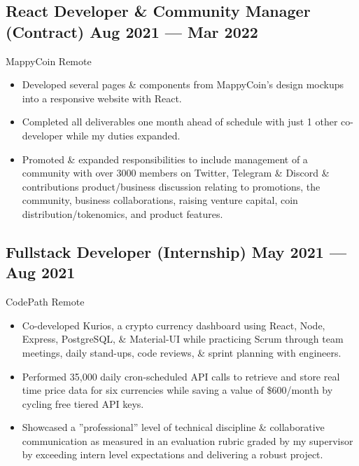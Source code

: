 \documentclass[a4,10pt]{article}
\newcommand{\subtext}[1]{
#1\par\vspace{-0.2cm}}
\newenvironment{zitemize}{
\begin{itemize}\itemsep0pt \parskip0pt \parsep1pt}
{\end{itemize}\vspace{-0.5cm}}
\begin{document}
\subsection*{React Developer \& Community Manager {\normalsize \normalfont(Contract) } \hfill  Aug 2021 --- Mar 2022 }
\subtext{MappyCoin \hfill Remote } 
    \begin{zitemize}
        \item Developed several pages \& components from MappyCoin's design mockups into a responsive website with React.
        \item Completed all deliverables one month ahead of schedule with just 1 other co-developer while my duties expanded.
        \item Promoted \& expanded responsibilities to include management of a community with over 3000 members on Twitter, Telegram \& Discord \& contributions product/business discussion relating to promotions, the community, business collaborations, raising venture capital, coin distribution/tokenomics, and product features.
    \end{zitemize}


\subsection*{Fullstack Developer {\normalsize \normalfont(Internship) } \hfill  May 2021 --- Aug 2021 }
\subtext{CodePath \hfill Remote } 
    \begin{zitemize}
        \item Co-developed Kurios, a crypto currency dashboard using React, Node, Express, PostgreSQL, \& Material-UI while practicing Scrum through team meetings, daily stand-ups, code reviews, \& sprint planning with engineers.
        \item Performed 35,000 daily cron-scheduled API calls to retrieve and store real time price data for six currencies while saving a value of \$600/month by cycling free tiered API keys.
        \item Showcased a ”professional” level of technical discipline \& collaborative communication as measured in an evaluation rubric graded by my supervisor by exceeding intern level expectations and delivering a robust project.
    \end{zitemize}

\end{document}
